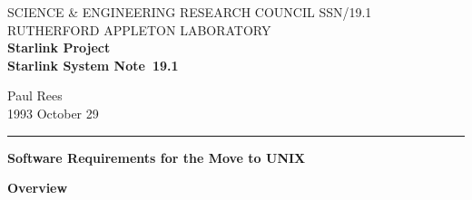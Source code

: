 \pagestyle{myheadings}

\newcommand{\stardoccategory}  {Starlink System Note}
\newcommand{\stardocinitials}  {SSN}
\newcommand{\stardocnumber}    {19.1}
\newcommand{\stardocauthors}   {Paul Rees}
\newcommand{\stardocdate}      {1993 October 29}
\newcommand{\stardoctitle}     {Software Requirements for the Move to UNIX}

\newcommand{\stardocname}{\stardocinitials /\stardocnumber}
\renewcommand{\_}{{\tt\char'137}}     %
\markright{\stardocname}
\setlength{\textwidth}{160mm}
\setlength{\textheight}{216mm}
\setlength{\topmargin}{-2mm}
\setlength{\oddsidemargin}{0mm}
\setlength{\evensidemargin}{0mm}
\setlength{\parindent}{0mm}
\setlength{\parskip}{\medskipamount}
\setlength{\unitlength}{1mm}

\newcommand{\starsitename}{Starlink Site Name}
\newcommand{\starnodename}{Starlink Node Name}
\newcommand{\starunixdate}{UNIX Migration Deadline}
\newcommand{\starupdate}{Information Last Updated}
\newcommand{\starsitetelephone}{Site Manager Telephone Number}
\newcommand{\starsitefax}{Site Manager Fax Number}


\thispagestyle{empty}
SCIENCE \& ENGINEERING RESEARCH COUNCIL \hfill \stardocname\\
RUTHERFORD APPLETON LABORATORY\\
{\large\bf Starlink Project\\}
{\large\bf \stardoccategory\ \stardocnumber}
\begin{flushright}
\stardocauthors\\
\stardocdate
\end{flushright}
\vspace{-4mm}
\rule{\textwidth}{0.5mm}
\vspace{5mm}
\begin{center}
{\Large\bf \stardoctitle}
\end{center}
\vspace{5mm}

\vspace{30mm}

\begin{center}
{\bf Overview}
\end{center}

